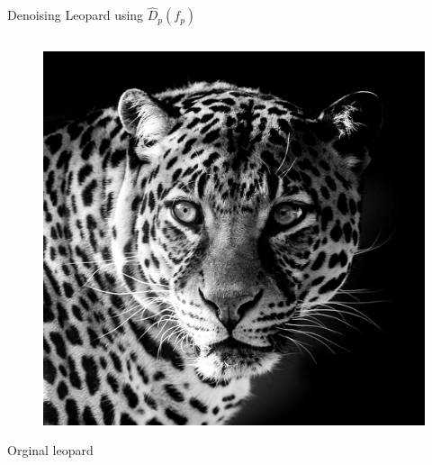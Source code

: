 \documentclass[mathserif]{beamer}
\begin{document}
\begin{frame}{Denoising Leopard using $\hat D_p(f_p)$ }
\begin{columns}
\begin{column}{.5\textwidth}
{\begin{figure}
                    \includegraphics[width=1\textwidth]{../testimages/leopard/leopard_500.png}
                \end{figure}
                \centering Orginal leopard
            }
        \end{column}
    \end{columns}
\end{frame}
\end{document}
